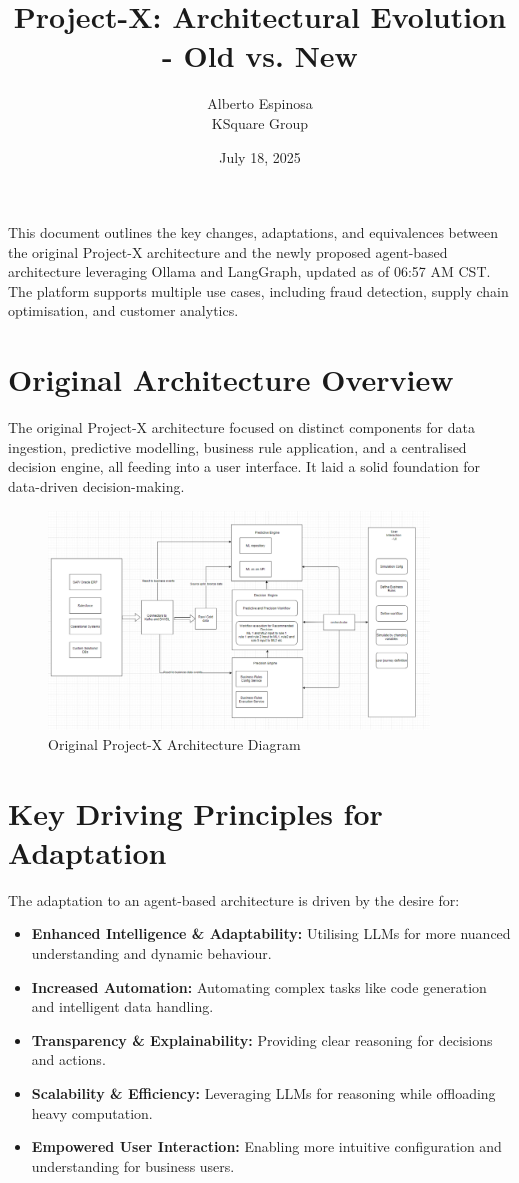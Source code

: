 \documentclass{article}
\title{Project-X: Architectural Evolution - Old vs. New}
\author{Alberto Espinosa\\
KSquare Group}
\date{July 18, 2025}
\begin{document}
\maketitle

This document outlines the key changes, adaptations, and equivalences between the original Project-X architecture and the newly proposed agent-based architecture leveraging Ollama and LangGraph, updated as of 06:57 AM CST. The platform supports multiple use cases, including fraud detection, supply chain optimisation, and customer analytics.

\section{Original Architecture Overview}
The original Project-X architecture focused on distinct components for data ingestion, predictive modelling, business rule application, and a centralised decision engine, all feeding into a user interface. It laid a solid foundation for data-driven decision-making.

\begin{figure}[H]
    \centering
    \includegraphics[width=0.9\textwidth]{ProjectX Architecture.png}
    \caption{Original Project-X Architecture Diagram}
    \label{fig:old_architecture}
\end{figure}

\section{Key Driving Principles for Adaptation}
The adaptation to an agent-based architecture is driven by the desire for:
\begin{itemize}
    \item \textbf{Enhanced Intelligence \& Adaptability:} Utilising LLMs for more nuanced understanding and dynamic behaviour.
    \item \textbf{Increased Automation:} Automating complex tasks like code generation and intelligent data handling.
    \item \textbf{Transparency \& Explainability:} Providing clear reasoning for decisions and actions.
    \item \textbf{Scalability \& Efficiency:} Leveraging LLMs for reasoning while offloading heavy computation.
    \item \textbf{Empowered User Interaction:} Enabling more intuitive configuration and understanding for business users.
\end{itemize}
\end{document}

